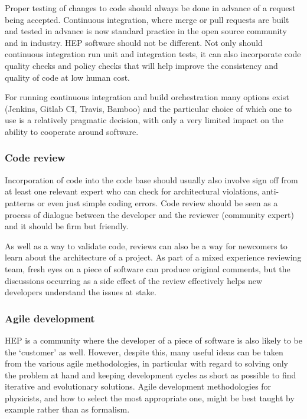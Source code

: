 \documentclass[12pt,a4paper]{article}
\begin{document}
Proper testing of changes to code should always be done in advance of a
request being accepted. Continuous integration, where merge or pull
requests are built and tested in advance is now standard practice in the
open source community and in industry. HEP software should not be
different. Not only should continuous integration run unit and
integration tests, it can also incorporate code quality checks and
policy checks that will help improve the consistency and quality of code
at low human cost.

For running continuous integration and build orchestration many options
exist (Jenkins, Gitlab CI, Travis, Bamboo) and the particular choice of %
which one to use is a relatively pragmatic decision, with only a very
limited impact on the ability to cooperate around software.

\hypertarget{code-review}{%
\subsubsection{Code review}\label{code-review}}

Incorporation of code into the code base should usually also involve
sign off from at least one relevant expert who can check for
architectural violations, anti-patterns or even just simple coding
errors. Code review should be seen as a process of dialogue between the
developer and the reviewer (community expert) and it should be firm but
friendly.

As well as a way to validate code, reviews can also be a way for
newcomers to learn about the architecture of a project. As part of a
mixed experience reviewing team, fresh eyes on a piece of software can
produce original comments, but the discussions occurring as a side
effect of the review effectively helps new developers understand the
issues at stake.

\hypertarget{agile-development}{%
\subsubsection{Agile development}\label{agile-development}}

HEP is a community where the developer of a piece of software is also
likely to be the `customer' as well. However, despite this, many useful
ideas can be taken from the various agile methodologies, in particular
with regard to solving only the problem at hand and keeping development
cycles as short as possible to find iterative and evolutionary
solutions. Agile development methodologies for physicists, and how to
select the most appropriate one, might be best taught by example rather
than as formalism.
\end{document}
